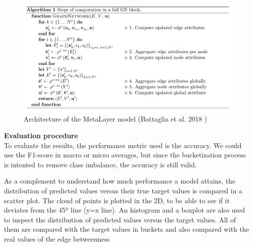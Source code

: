  \begin{figure}[H]
    \centering
        \includegraphics[width=0.85\linewidth]{img/metalayer-algorithm.png}
    \caption{Architecture of the MetaLayer model (Battaglia et al. 2018  \cite{battaglia2018relational} )}\label{fig:metalayer_algorithm}
\end{figure}




\textbf{Evaluation procedure}\\
To evaluate the results, the performance metric used is the accuracy. We could use the F1-score in macro or micro averages, but since the bucketization process is intented to remove class imbalance, the accuracy is still valid.


As a complement to understand how much performance a model attains, the distribution of predicted values versus their true target values is compared in a scatter plot. The cloud of points is plotted in the 2D, to be able to see if it deviates from the 45º line (y=x line). An histogram and a boxplot are also used to inspect the distribution of predicted values versus the target values. All of them are compared with the target values in buckets and also compared with the real values of the edge betweenness \\
\\



